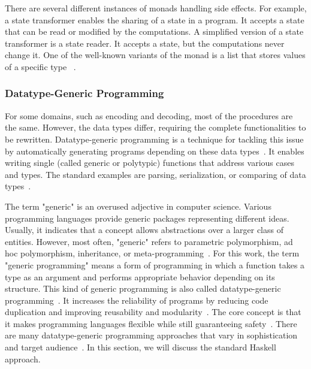 \begin{frame}
There are several different instances of monads handling side effects. For example, a state transformer enables the sharing of a state in a program. It accepts a state that can be read or modified by the computations. A simplified version of a state transformer is a state reader. It accepts a state, but the computations never change it. One of the well-known variants of the monad is a list that stores values of a specific type ~\cite{history-of-haskell}.


\end{frame}

\begin{frame}\frametitle{Datatype-Generic Programming}
    
 For some domains, such as encoding and decoding, most of the procedures are the same. However, the data types differ, requiring the complete functionalities to be rewritten. Datatype-generic programming is a technique for tackling this issue by automatically generating programs depending on these data types~\cite{comparing-generic-approaches, datatype-generic-programming}. 
    It enables writing single (called generic or polytypic) functions that address various cases and types. The standard examples are parsing,  serialization, or comparing of data types~\cite{derivable-type-classes}.
    
    The term "generic" is an overused adjective in computer science. 
    Various programming languages provide generic packages 
    representing different ideas. 
    Usually, it indicates that a concept allows abstractions over a larger class of entities. 
    However, most often, "generic" refers to parametric polymorphism, 
    ad hoc polymorphism, inheritance, or meta-programming~\cite{optimizing-generics,datatype-generic-programming}.  
    For this work, the term "generic programming" means a form of programming in which a function takes a type as an argument and performs appropriate behavior depending on its structure. 
    This kind of generic programming is also called datatype-generic programming~\cite{comparing-generic-approaches, datatype-generic-programming}.
    It increases the reliability of programs by reducing code duplication and improving reusability and modularity~\cite{optimizing-generics}.
    The core concept is that it makes programming languages flexible while still guaranteeing safety~\cite{datatype-generic-programming}.
    There are many datatype-generic programming approaches that vary in sophistication and target audience~\cite{comparing-generic-approaches, optimizing-generics}.
    In this section, we will discuss the standard Haskell approach.
    

\end{frame}
